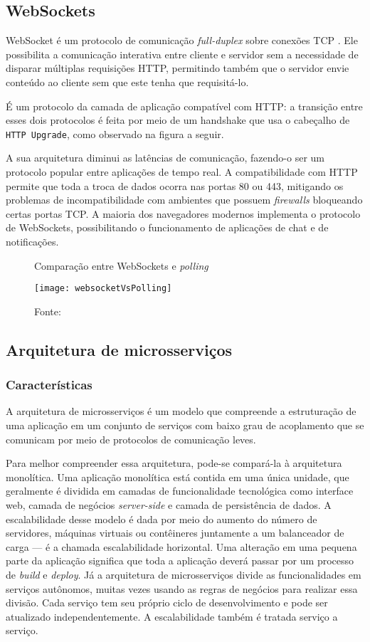 \subsection{WebSockets \label{sub:websocket}}

WebSocket é um protocolo de comunicação \emph{full-duplex} sobre conexões TCP \cite{rfc6455}. Ele possibilita a comunicação interativa entre cliente e servidor sem a necessidade de disparar múltiplas requisições HTTP, permitindo também que o servidor envie conteúdo ao cliente sem que este tenha que requisitá-lo.

É um protocolo da camada de aplicação compatível com HTTP: a transição entre esses dois protocolos é feita por meio de um handshake que usa o cabeçalho de \texttt{HTTP Upgrade}, como observado na figura a seguir.

A sua arquitetura diminui as latências de comunicação, fazendo-o ser um protocolo popular entre aplicações de tempo real. A compatibilidade com HTTP permite que toda a troca de dados ocorra nas portas 80 ou 443, mitigando os problemas de incompatibilidade com ambientes que possuem \emph{firewalls} bloqueando certas portas TCP. A maioria dos navegadores modernos implementa o protocolo de WebSockets, possibilitando o funcionamento de aplicações de chat e de notificações.

\begin{figure}[H]
	\centering
	\caption{Comparação entre WebSockets e \emph{polling}}
  \texttt{[image: websocketVsPolling]}
	\caption*{Fonte: \cite{lubbers}}
\label{fig:websocketVsPolling}
\end{figure}

\subsection{Arquitetura de microsserviços}

\subsubsection{Características}
A arquitetura de microsserviços é um modelo que compreende a estruturação de uma aplicação em um conjunto de serviços com baixo grau de acoplamento que se comunicam por meio de protocolos de comunicação leves.

Para melhor compreender essa arquitetura, pode-se compará-la à arquitetura monolítica. Uma aplicação monolítica está contida em uma única unidade, que geralmente é dividida em camadas de funcionalidade tecnológica como interface web, camada de negócios \emph{server-side} e camada de persistência de dados. A escalabilidade desse modelo é dada por meio do aumento do número de servidores, máquinas virtuais ou contêineres juntamente a um balanceador de carga --- é a chamada escalabilidade horizontal. Uma alteração em uma pequena parte da aplicação significa que toda a aplicação deverá passar por um processo de \textit{build} e \textit{deploy}. Já a arquitetura de microsserviços divide as funcionalidades em serviços autônomos, muitas vezes usando as regras de negócios para realizar essa divisão. Cada serviço tem seu próprio ciclo de desenvolvimento e pode ser atualizado independentemente. A escalabilidade também é tratada serviço a serviço.

